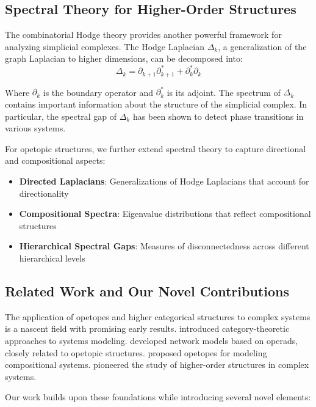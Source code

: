 \subsection{Spectral Theory for Higher-Order Structures}
The combinatorial Hodge theory provides another powerful framework for analyzing simplicial complexes. The Hodge Laplacian $\Delta_k$, a generalization of the graph Laplacian to higher dimensions, can be decomposed into:
\begin{equation}
\Delta_k = \partial_{k+1}\partial_{k+1}^* + \partial_k^*\partial_k
\end{equation}

Where $\partial_k$ is the boundary operator and $\partial_k^*$ is its adjoint. The spectrum of $\Delta_k$ contains important information about the structure of the simplicial complex. In particular, the spectral gap of $\Delta_k$ has been shown to detect phase transitions in various systems.

For opetopic structures, we further extend spectral theory to capture directional and compositional aspects:

\begin{itemize}
    \item \textbf{Directed Laplacians}: Generalizations of Hodge Laplacians that account for directionality
    \item \textbf{Compositional Spectra}: Eigenvalue distributions that reflect compositional structures
    \item \textbf{Hierarchical Spectral Gaps}: Measures of disconnectedness across different hierarchical levels
\end{itemize}

\subsection{Related Work and Our Novel Contributions}
The application of opetopes and higher categorical structures to complex systems is a nascent field with promising early results. \citet{spivak2013categorical} introduced category-theoretic approaches to systems modeling. \citet{baez2020network} developed network models based on operads, closely related to opetopic structures. \citet{weinstein2023opetopes} proposed opetopes for modeling compositional systems. \citet{baas2009higher} pioneered the study of higher-order structures in complex systems.

Our work builds upon these foundations while introducing several novel elements:

